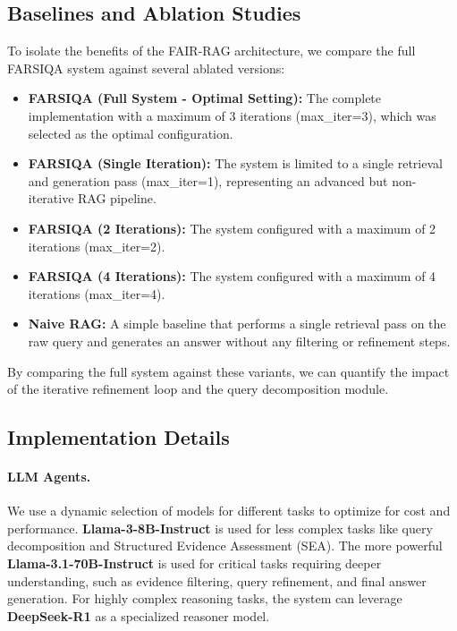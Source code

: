 \documentclass[11pt]{article}
\begin{document}
\subsection{Baselines and Ablation Studies}

To isolate the benefits of the FAIR-RAG architecture, we compare the full FARSIQA system against several ablated versions:

\begin{itemize}
    \item \textbf{FARSIQA (Full System - Optimal Setting):} The complete implementation with a maximum of 3 iterations (max\_iter=3), which was selected as the optimal configuration.
    \item \textbf{FARSIQA (Single Iteration):} The system is limited to a single retrieval and generation pass (max\_iter=1), representing an advanced but non-iterative RAG pipeline.
    \item \textbf{FARSIQA (2 Iterations):} The system configured with a maximum of 2 iterations (max\_iter=2).
    \item \textbf{FARSIQA (4 Iterations):} The system configured with a maximum of 4 iterations (max\_iter=4).
    \item \textbf{Naive RAG:} A simple baseline that performs a single retrieval pass on the raw query and generates an answer without any filtering or refinement steps.
\end{itemize}

By comparing the full system against these variants, we can quantify the impact of the iterative refinement loop and the query decomposition module.

\subsection{Implementation Details}

\paragraph{LLM Agents.}
We use a dynamic selection of models for different tasks to optimize for cost and performance. \textbf{Llama-3-8B-Instruct} \cite{meta2024llama3} is used for less complex tasks like query decomposition and Structured Evidence Assessment (SEA). The more powerful \textbf{Llama-3.1-70B-Instruct} \cite{meta2024llama3} is used for critical tasks requiring deeper understanding, such as evidence filtering, query refinement, and final answer generation. For highly complex reasoning tasks, the system can leverage \textbf{DeepSeek-R1} \cite{deepseek2025r1} as a specialized reasoner model.
\end{document}
